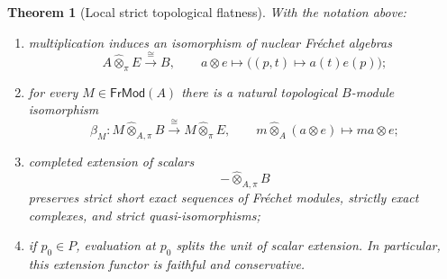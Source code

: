 \documentclass[12pt]{amsart}
\newtheorem{thm}{Theorem}[section]
\theoremstyle{definition}
\theoremstyle{remark}
\numberwithin{equation}{section}
\newcommand{\1}{{\mathbb{1}}}
\begin{document}
\begin{thm}[Local strict topological flatness]
\label{thm:top-flat}
With the notation above:
\begin{enumerate}
 \item multiplication induces an isomorphism of nuclear Fr\'echet
 algebras
 \[
  A\widehat\otimes_\pi E
  \xrightarrow{\;\cong\;}B,
  \qquad
  a\otimes e\longmapsto
  \bigl((p,t)\mapsto a(t)e(p)\bigr);
 \]
 \item for every $M\in\mathsf{FrMod}(A)$ there is a natural
 topological $B$-module isomorphism
 \[
  \beta_M:
  M\mathbin{\widehat\otimes_{A,\pi}}B
  \xrightarrow{\;\cong\;}
  M\widehat\otimes_\pi E,
  \qquad
  m\widehat\otimes_A(a\otimes e)\longmapsto ma\otimes e;
 \]
 \item completed extension of scalars
 \[
  -\mathbin{\widehat\otimes_{A,\pi}}B
 \]
 preserves strict short exact sequences of Fr\'echet modules,
 strictly exact complexes, and strict quasi-isomorphisms;
 \item if $p_0\in P$, evaluation at $p_0$ splits the unit of scalar
 extension.  In particular, this extension functor is faithful and
 conservative.
\end{enumerate}
\end{thm}
\end{document}
